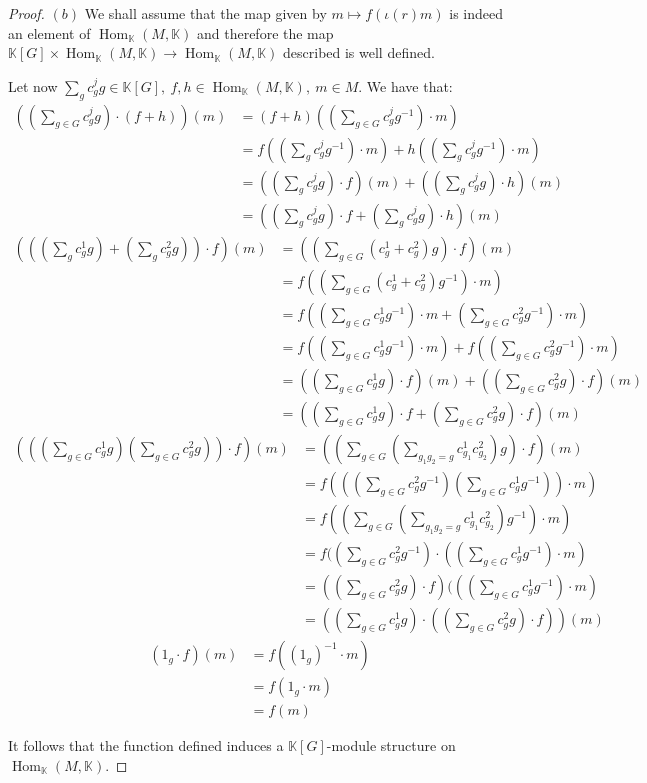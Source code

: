 \documentclass{article}
\newcommand{\numberset}{\mathbb}
\newcommand{\K}{\numberset{K}}
\DeclareMathOperator{\Hom}{Hom}
\begin{document}
\begin{proof}
	$(b)$ We shall assume that the map given by $m\mapsto f(\iota(r)m)$ is indeed an element of $\Hom_{\K}(M,\K)$ and therefore the map $\K[G]\times\Hom_{\K}(M,\K)\rightarrow\Hom_{\K}(M,\K)$ described is well defined.
	
	Let now $\sum_g c^j_gg\in\K[G],\ f,h\in\Hom_{\K}(M,\K),\ m\in M$. We have that:
	\begin{align*}
		((\sum_{g\in G} c^j_gg)\cdot (f+h))(m) &=(f+h)((\sum_{g\in G} c^j_gg^{-1})\cdot m) \\
		&=f((\sum_g c^j_gg^{-1})\cdot m)+h((\sum_g c^j_gg^{-1})\cdot m) \\
		&=((\sum_g c^j_gg)\cdot f)(m)+((\sum_g c^j_gg)\cdot h)(m) \\
		&=((\sum_g c^j_gg)\cdot f+(\sum_g c^j_gg)\cdot h)(m)
	\end{align*}
	\begin{align*}	
		(((\sum_g c^1_gg)+(\sum_g c^2_gg))\cdot f)(m) &=((\sum_{g\in G} (c^1_g+c^2_g)g)\cdot f)(m) \\
		&=f((\sum_{g\in G} (c^1_g+c^2_g)g^{-1})\cdot m) \\
		&=f((\sum_{g\in G} c^1_gg^{-1})\cdot m+(\sum_{g\in G} c^2_gg^{-1})\cdot m) \\
		&=f((\sum_{g\in G} c^1_gg^{-1})\cdot m)+f((\sum_{g\in G} c^2_gg^{-1})\cdot m) \\
		&=((\sum_{g\in G} c^1_gg)\cdot f)(m)+((\sum_{g\in G} c^2_gg)\cdot f)(m) \\
		&=((\sum_{g\in G} c^1_gg)\cdot f+(\sum_{g\in G} c^2_gg)\cdot f)(m)
	\end{align*}
	\begin{align*}	
		(((\sum_{g\in G} c^1_gg)(\sum_{g\in G} c^2_gg))\cdot f)(m) &=((\sum_{g\in G} (\sum_{g_1g_2=g} c^1_{g_1}c^2_{g_2})g)\cdot f)(m) \\
		&=f(((\sum_{g\in G} c^2_gg^{-1})(\sum_{g\in G} c^1_gg^{-1}))\cdot m) \\
		&=f((\sum_{g\in G} (\sum_{g_1g_2=g} c^1_{g_1}c^2_{g_2})g^{-1})\cdot m) \\
		&=f((\sum_{g\in G} c^2_gg^{-1})\cdot ((\sum_{g\in G} c^1_gg^{-1})\cdot m) \\
		&=((\sum_{g\in G} c^2_gg)\cdot f)(((\sum_{g\in G} c^1_gg^{-1})\cdot m) \\
		&=((\sum_{g\in G} c^1_gg)\cdot ((\sum_{g\in G} c^2_gg)\cdot f))(m)
	\end{align*}
	\begin{align*}
		(1_g\cdot f)(m) &=f((1_g)^{-1}\cdot m) \\
		&=f(1_g\cdot m) \\
		&=f(m)
	\end{align*}
	
	It follows that the function defined induces a $\K[G]$-module structure on $\Hom_{\K}(M,\K)$.
\end{proof}
\end{document}
